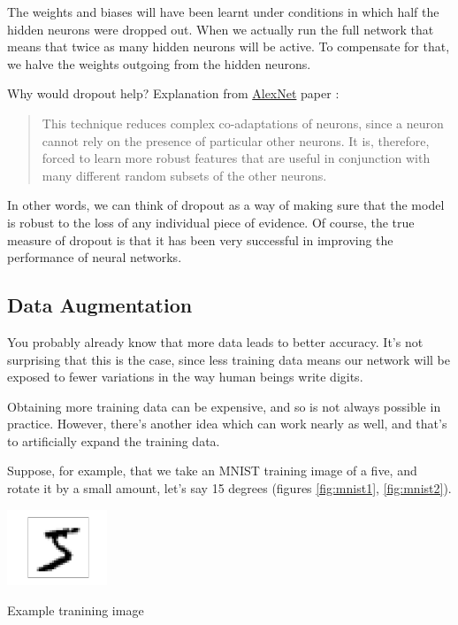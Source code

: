 \documentclass[a4paper]{tufte-handout}
\begin{document}
The weights and biases will have been learnt under conditions in which
half the hidden neurons were dropped out. When we actually run the full
network that means that twice as many hidden neurons will be active. To
compensate for that, we halve the weights outgoing from the hidden
neurons.

Why would dropout help? Explanation from
\href{https://papers.nips.cc/paper/4824-imagenet-classification-with-deep-convolutional-neural-networks.pdf}{AlexNet}
paper :

\begin{quote}
This technique reduces complex co-adaptations of neurons, since a neuron
cannot rely on the presence of particular other neurons. It is,
therefore, forced to learn more robust features that are useful in
conjunction with many different random subsets of the other neurons.
\end{quote}

In other words, we can think of dropout as a way of making sure that the
model is robust to the loss of any individual piece of evidence. Of
course, the true measure of dropout is that it has been very successful
in improving the performance of neural networks.

\subsection{Data Augmentation}\label{data-augmentation}

You probably already know that more data leads to better accuracy. It's
not surprising that this is the case, since less training data means our
network will be exposed to fewer variations in the way human beings
write digits.

Obtaining more training data can be expensive, and so is not always
possible in practice. However, there's another idea which can work
nearly as well, and that's to artificially expand the training data.

Suppose, for example, that we take an MNIST training image of a five,
and rotate it by a small amount, let's say 15 degrees (figures \ref{fig:mnist1}, \ref{fig:mnist2}).

\begin{marginfigure}
  \includegraphics[width=30mm]{more_data_5.png}
  \caption{Example tranining image}
  \label{fig:mnist1}
\end{marginfigure}
\end{document}
